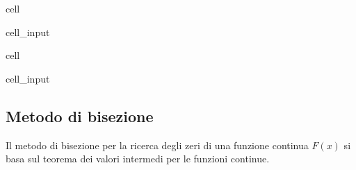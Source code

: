 \documentclass[letterpaper,10pt,italian]{jupyterBook}
\begin{document}
\begin{sphinxuseclass}{cell}\begin{sphinxVerbatimInput}

\begin{sphinxuseclass}{cell_input}
\begin{sphinxVerbatim}[commandchars=\\\{\}]

   
   
\end{sphinxVerbatim}

\end{sphinxuseclass}\end{sphinxVerbatimInput}

\end{sphinxuseclass}
\begin{sphinxuseclass}{cell}\begin{sphinxVerbatimInput}

\begin{sphinxuseclass}{cell_input}
\begin{sphinxVerbatim}[commandchars=\\\{\}]

       
      
\end{sphinxVerbatim}

\end{sphinxuseclass}\end{sphinxVerbatimInput}

\end{sphinxuseclass}

\subsection{Metodo di bisezione}
\label{\detokenize{ch/numerics/nonlinear:metodo-di-bisezione}}
\sphinxAtStartPar
Il metodo di bisezione per la ricerca degli zeri di una funzione continua \(F(x)\) si basa sul teorema dei valori intermedi per le funzioni continue.
\end{document}
